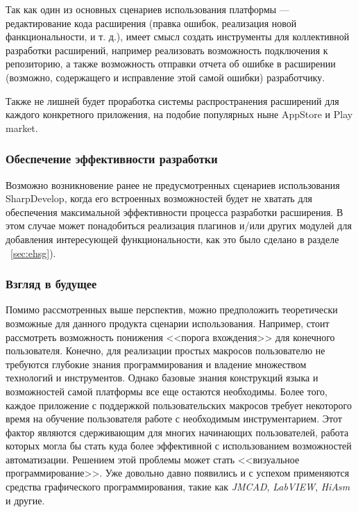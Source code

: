 Так как один из основных сценариев использования платформы --- редактирование кода расширения (правка ошибок, реализация новой фанкциональности, и т. д.), имеет смысл создать инструменты для коллективной разработки расширений, например реализовать возможность подключения к репозиторию, а также возможность отправки отчета об ошибке в расширении (возможно, содержащего и исправление этой самой ошибки) разработчику.

Также не лишней будет проработка системы распространения расширений для каждого конкретного приложения, на подобие популярных ныне AppStore и Play market.

\subsubsection{Обеспечение эффективности разработки}

Возможно возникновение ранее не предусмотренных сценариев использования SharpDevelop, когда его встроенных возможностей будет не хватать для обеспечения максимальной эффективности процесса разработки расширения. В этом случае может понадобиться реализация плагинов и/или других модулей для добавления интересующей функциональности, как это было сделано в разделе ~\ref{sec:ehsg}).

\subsubsection{Взгляд в будущее}

Помимо рассмотренных выше перспектив, можно предположить теоретически возможные для данного продукта сценарии использования. Например, стоит рассмотреть возможность понижения <<порога вхождения>> для конечного пользователя. Конечно, для реализации простых макросов пользователю не требуются глубокие знания программирования и владение множеством технологий и инструментов. Однако базовые знания конструкций языка и возможностей самой платформы все еще остаются необходимы. Более того, каждое приложение с поддержкой пользовательских макросов требует некоторого время на обучение пользователя работе с необходимым  инструментарием. Этот фактор являются сдерживающим для многих начинающих пользователей, работа которых могла бы стать куда более эффективной с использованием возможностей автоматизации. Решением этой проблемы может стать <<визуальное программирование>>. Уже довольно давно появились и с успехом применяются средства графического программирования, такие как {\it JMCAD}, {\it LabVIEW}, {\it HiAsm} и другие.

